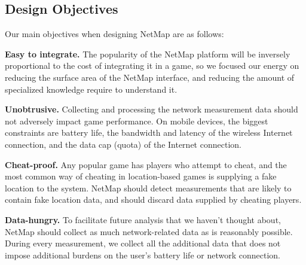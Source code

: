 \subsection{Design Objectives}

Our main objectives when designing NetMap are as follows:

\textbf{Easy to integrate.} The popularity of the NetMap platform will be
inversely proportional to the cost of integrating it in a game, so we focused
our energy on reducing the surface area of the NetMap interface, and reducing
the amount of specialized knowledge require to understand it.

\textbf{Unobtrusive.} Collecting and processing the network measurement data
should not adversely impact game performance. On mobile devices, the biggest
constraints are battery life, the bandwidth and latency of the wireless
Internet connection, and the data cap (quota) of the Internet connection.

\textbf{Cheat-proof.} Any popular game has players who attempt to cheat, and
the most common way of cheating in location-based games is supplying a fake
location to the system. NetMap should detect measurements that are likely to
contain fake location data, and should discard data supplied by cheating
players.

\textbf{Data-hungry.} To facilitate future analysis that we haven't thought
about, NetMap should collect as much network-related data as is reasonably
possible. During every measurement, we collect all the additional data that
does not impose additional burdens on the user's battery life or network
connection.
